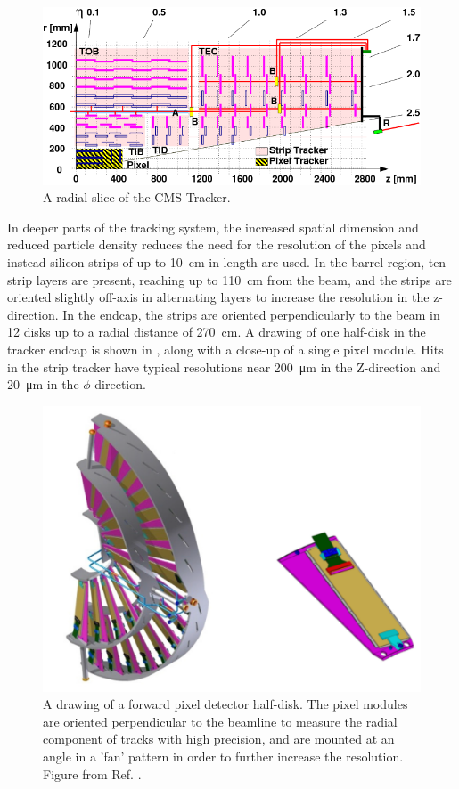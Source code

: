 \begin{figure}[htbp]
    \includegraphics[width=1.1\textwidth]{figures/cms_tracker.png}
    \centering
    \caption{A radial slice of the CMS Tracker.}
    \label{fig:cmsTracker}
\end{figure}

In deeper parts of the tracking system, the increased spatial dimension and reduced particle density reduces the need for the resolution of the pixels and instead silicon strips of up to \SI{10}{\centi\meter} in length are used. 
In the barrel region, ten strip layers are present, reaching up to \SI{110}{\centi\meter} from the beam, and the strips are oriented slightly off-axis in alternating layers to increase the resolution in the z-direction. 
In the endcap, the strips are oriented perpendicularly to the beam in 12 disks up to a radial distance of \SI{270}{\centi\meter}.
A drawing of one half-disk in the tracker endcap is shown in , along with a close-up of a single pixel module.
Hits in the strip tracker have typical resolutions near \SI{200}{\micro\meter} in the Z-direction and \SI{20}{\micro\meter} in the $\phi$ direction.

\begin{figure}[htbp]
    \includegraphics[width=1.1\textwidth]{figures/fpix_drawing.png}
    \centering
	\caption[Schematic of a forward tracker half-disk]{A drawing of a forward pixel detector half-disk. The pixel modules are oriented perpendicular to the beamline to measure the radial component of tracks with high precision, and are mounted at an angle in a 'fan' pattern in order to further increase the resolution. Figure from Ref. \cite{pixelUpgrade}.}
    \label{fig:cmsTracker}
\end{figure}

